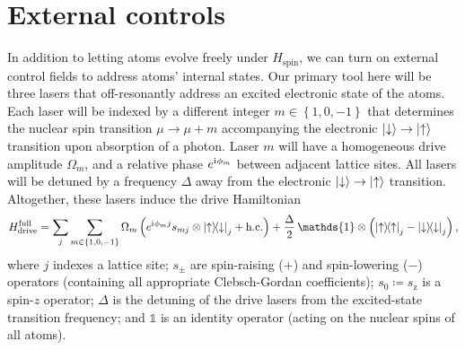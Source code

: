 \documentclass[nofootinbib,notitlepage,11pt]{revtex4-2}
\renewcommand{\t}{\text} %
\newcommand{\f}[2]{\dfrac{#1}{#2}} %
\newcommand{\p}[1]{\left(#1\right)} %
\renewcommand{\set}[1]{\left\{#1\right\}} %
\renewcommand{\i}{\mathrm{i}\mkern1mu} %
\newcommand{\1}{\mathds{1}}
\newcommand{\up}{\uparrow}
\newcommand{\dn}{\downarrow}
\newcommand{\z}{\text{z}}
\begin{document}
\section{External controls}
\label{sec:controls}

In addition to letting atoms evolve freely under $H_{\t{spin}}$, we can turn on external control fields to address atoms' internal states.
Our primary tool here will be three lasers that off-resonantly address an excited electronic state of the atoms.
Each laser will be indexed by a different integer $m\in\set{1,0,-1}$ that determines the nuclear spin transition $\mu\to\mu+m$ accompanying the electronic $\ket\dn\to\ket\up$ transition upon absorption of a photon.
Laser $m$ will have a homogeneous drive amplitude $\Omega_m$, and a relative phase $e^{\i\phi_m}$ between adjacent lattice sites.
All lasers will be detuned by a frequency $\Delta$ away from the electronic $\ket\dn\to\ket\up$ transition.
Altogether, these lasers induce the drive Hamiltonian
\begin{align}
  H_{\t{drive}}^{\t{full}} = \sum_j \sum_{m\in\set{1,0,-1}} \Omega_m
  \p{e^{\i\phi_m j} s_{mj} \otimes\op{\up}{\dn}_j + \t{h.c.}}
  + \f{\Delta}{2}\, \1 \otimes\p{\op\up_j-\op\dn_j},
  \label{eq:drive_full}
\end{align}
where $j$ indexes a lattice site; $s_\pm$ are spin-raising ($+$) and spin-lowering ($-$) operators (containing all appropriate Clebsch-Gordan coefficients); $s_0\coloneqq s_\z$ is a spin-$z$ operator; $\Delta$ is the detuning of the drive lasers from the excited-state transition frequency; and $\1$ is an identity operator (acting on the nuclear spins of all atoms).
\end{document}

